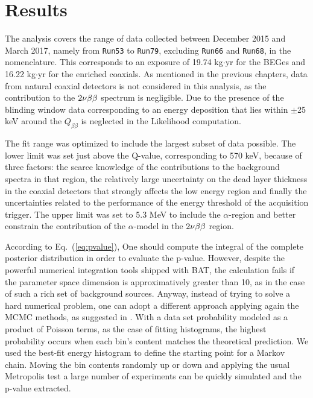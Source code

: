 \section{Results}\label{sec:results}
The analysis covers the range of data collected between December 2015 and March 2017, namely from \texttt{Run53} to \texttt{Run79}, excluding \texttt{Run66} and \texttt{Run68}, in the {\gerda} nomenclature. This corresponds to an exposure of 19.74 kg$\cdot$yr for the BEGes and 16.22 kg$\cdot$yr for the enriched coaxials. As mentioned in the previous chapters, data from natural coaxial detectors is not considered in this analysis, as the contribution to the $2\nu\beta\beta$ spectrum is negligible. Due to the presence of the blinding window data corresponding to an energy deposition that lies within $\pm$25 keV around the $Q_{\beta\beta}$ is neglected in the Likelihood computation.

The fit range was optimized to include the largest subset of data possible. The lower limit was set just above the  Q-value, corresponding to 570 keV, because of three factors: the scarce knowledge of the contributions to the background spectra in that region, the relatively large uncertainty on the dead layer thickness in the coaxial detectors that strongly affects the low energy region and finally the uncertainties related to the performance of the energy threshold of the acquisition trigger. The upper limit was set to 5.3 MeV to include the $\alpha$-region and better constrain the contribution of the $\alpha$-model in the $2\nu\beta\beta$ region.

 According to Eq.~(\ref{eq:pvalue}), One should compute the integral of the complete posterior distribution in order to evaluate the p-value. However, despite the powerful numerical integration tools shipped with BAT, the calculation fails if the parameter space dimension is approximatively greater than 10, as in the case of such a rich set of background sources. Anyway, instead of trying to solve a hard numerical problem, one can adopt a different approach applying again the MCMC methods, as suggested in \cite{p-value}. With a data set probability modeled as a product of Poisson terms, as the case of fitting histograms, the highest probability occurs when each bin's content matches the theoretical prediction. We used the best-fit energy histogram to define the starting point for a Markov chain. Moving the bin contents randomly up or down and applying the usual Metropolis test a large number of experiments can be quickly simulated and the p-value extracted.

